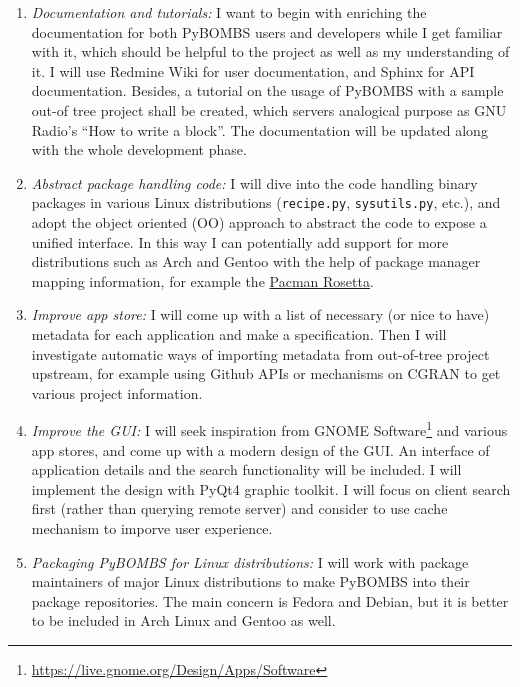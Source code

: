 \documentclass[a4paper]{article}
\begin{document}
\begin{enumerate}
  \item \emph{Documentation and tutorials:} I want to begin with
    enriching the documentation for both PyBOMBS users and developers
    while I get familiar with it, which should be helpful to the
    project as well as my understanding of it. I will use Redmine Wiki
    for user documentation, and Sphinx for API documentation.
    Besides, a tutorial on the usage of PyBOMBS with a sample out-of\-
    tree project shall be created, which servers analogical purpose as
    GNU Radio's ``How to write a block''. The documentation will be
    updated along with the whole development phase.
  \item \emph{Abstract package handling code:} I will dive into the
    code handling binary packages in various Linux distributions
    (\nolinkurl{recipe.py}, \nolinkurl{sysutils.py}, etc.), and
    adopt the object oriented (OO) approach to abstract the code to
    expose a unified interface. In this way I can
    potentially add support for more distributions such as Arch and Gentoo
    with the help of package manager mapping information, for example
    the \href{https://wiki.archlinux.org/index.php/Pacman_Rosetta}%
    {Pacman Rosetta}.
  \item \emph{Improve app store:} I will come up with a list of
    necessary (or nice to have) metadata for each application and make a
    specification. Then I will investigate automatic ways of importing
    metadata from out-of-tree project upstream, for example using Github
    APIs or mechanisms on CGRAN to get various project information.
  \item \emph{Improve the GUI:} I will seek inspiration from GNOME
    Software\footnote{\url{https://live.gnome.org/Design/Apps/Software}}
    and various app stores, and come up with a modern design
    of the GUI. An interface of application details and the search
    functionality will be included. I will implement the design with
    PyQt4 graphic toolkit. I will focus on client search first (rather
    than querying remote server) and consider to use cache mechanism to
    imporve user experience.
  \item \emph{Packaging PyBOMBS for Linux distributions:} I will
    work with package maintainers of major Linux distributions to make
    PyBOMBS into their package repositories. The main concern is Fedora
    and Debian, but it is better to be included in Arch Linux and Gentoo
    as well.
\end{enumerate}
\end{document}
